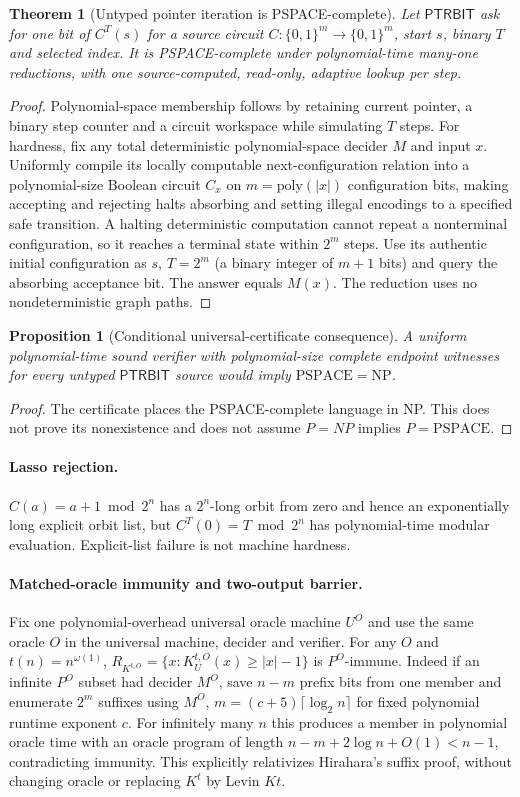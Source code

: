 \documentclass[11pt]{article}
\newtheorem{theorem}{Theorem}
\newtheorem{proposition}{Proposition}
\begin{document}
\begin{theorem}[Untyped pointer iteration is PSPACE-complete]
Let $\mathsf{PTRBIT}$ ask for one bit of $C^T(s)$ for a source circuit $C:\{0,1\}^m\to\{0,1\}^m$, start $s$, binary $T$ and selected index. It is PSPACE-complete under polynomial-time many-one reductions, with one source-computed, read-only, adaptive lookup per step.
\end{theorem}
\begin{proof}
Polynomial-space membership follows by retaining current pointer, a binary step counter and a circuit workspace while simulating $T$ steps. For hardness, fix any total deterministic polynomial-space decider $M$ and input $x$. Uniformly compile its locally computable next-configuration relation into a polynomial-size Boolean circuit $C_x$ on $m=\mathrm{poly}(|x|)$ configuration bits, making accepting and rejecting halts absorbing and setting illegal encodings to a specified safe transition. A halting deterministic computation cannot repeat a nonterminal configuration, so it reaches a terminal state within $2^m$ steps. Use its authentic initial configuration as $s$, $T=2^m$ (a binary integer of $m+1$ bits) and query the absorbing acceptance bit. The answer equals $M(x)$. The reduction uses no nondeterministic graph paths.
\end{proof}
\begin{proposition}[Conditional universal-certificate consequence]
A uniform polynomial-time sound verifier with polynomial-size complete endpoint witnesses for \emph{every} untyped $\mathsf{PTRBIT}$ source would imply $\mathrm{PSPACE}=\mathrm{NP}$.
\end{proposition}
\begin{proof} The certificate places the PSPACE-complete language in NP. This does not prove its nonexistence and does not assume $P=NP$ implies $P=\mathrm{PSPACE}$.\end{proof}
\paragraph{Lasso rejection.} $C(a)=a+1\bmod2^n$ has a $2^n$-long orbit from zero and hence an exponentially long explicit orbit list, but $C^T(0)=T\bmod2^n$ has polynomial-time modular evaluation. Explicit-list failure is not machine hardness.

\paragraph{Matched-oracle immunity and two-output barrier.}
Fix one polynomial-overhead universal oracle machine $U^O$ and use the same oracle $O$ in the universal machine, decider and verifier. For any $O$ and $t(n)=n^{\omega(1)}$, $R_{K^{t,O}}=\{x:K_U^{t,O}(x)\ge|x|-1\}$ is $P^O$-immune. Indeed if an infinite $P^O$ subset had decider $M^O$, save $n-m$ prefix bits from one member and enumerate $2^m$ suffixes using $M^O$, $m=(c+5)\lceil\log_2 n\rceil$ for fixed polynomial runtime exponent $c$. For infinitely many $n$ this produces a member in polynomial oracle time with an oracle program of length $n-m+2\log n+O(1)<n-1$, contradicting immunity. This explicitly relativizes Hirahara's suffix proof, without changing oracle or replacing $K^t$ by Levin $Kt$.
\end{document}
